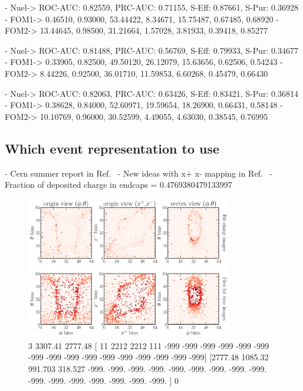 - Nuel-> ROC-AUC: 0.82559, PRC-AUC: 0.71155, S-Eff: 0.87661, S-Pur: 0.36928
- FOM1-> 0.46510, 0.93000, 53.44422, 8.34671, 15.75487, 0.67485, 0.68920
- FOM2-> 13.44645, 0.98500, 31.21664, 1.57028, 3.81933, 0.39418, 0.85277

- Nuel-> ROC-AUC: 0.81488, PRC-AUC: 0.56769, S-Eff: 0.79933, S-Pur: 0.34677
- FOM1-> 0.33905, 0.82500, 49.50120, 26.12079, 15.63656, 0.62506, 0.54243
- FOM2-> 8.44226, 0.92500, 36.01710, 11.59853, 6.60268, 0.45479, 0.66430

- Nuel-> ROC-AUC: 0.82063, PRC-AUC: 0.63426, S-Eff: 0.83421, S-Pur: 0.36814
- FOM1-> 0.38628, 0.84000, 52.60971, 19.59654, 18.26900, 0.66431, 0.58148
- FOM2-> 10.10769, 0.96000, 30.52599, 4.49055, 4.63030, 0.38545, 0.76995

\subsection{Which event representation to use} %
\label{sec:cvn_baseline_repr} %

- Cern summer report in Ref.~\cite{theodore2016}
- New ideas with x+ x- mapping in Ref.~\cite{berns2020}
- Fraction of deposited charge in endcaps = 0.4769380479133997

\begin{figure} %
    \includegraphics[width=0.8\textwidth]{diagrams/7-cvn/chipsnet/explore_nuel_ccres_event.pdf}
    \caption[explore nuel ccres event short]
    {3
        3307.41
        2777.48
            [  11 2212 2212  111 -999 -999 -999 -999 -999 -999 -999 -999 -999 -999
                -999 -999 -999 -999 -999 -999]
            [2777.48  1085.32   991.703  318.527 -999.    -999.    -999.    -999.
                -999.    -999.    -999.    -999.    -999.    -999.    -999.    -999.
                -999.    -999.    -999.    -999.   ]
        0}
    \label{fig:explore_nuel_ccres_event}
\end{figure}

